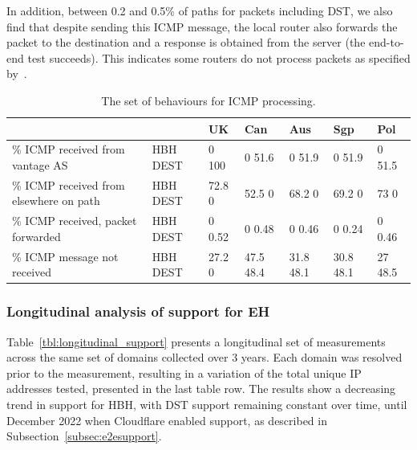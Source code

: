 \documentclass[conference]{IEEEtran}
\begin{document}
In addition, between 0.2 and 0.5\% of paths for packets including DST, we also find that despite sending this ICMP message, the local router also forwards the packet to the destination and a response is  obtained from the server (the end-to-end test succeeds). This indicates some routers do not process packets as specified by~\cite{RFC8200}.

\begin{table}
\begin{tabular}{p{}|p{}|p{}|p{}|p{}|p{}|p{}}

\centering

                                           &             & UK        & Can       & Aus    & Sgp          & Pol     \\
                                           \hline

{\% ICMP received from vantage AS}        & {HBH DEST} & {0 100}  & {0 51.6}    & {0 51.9}    & {0 51.9}    & {0 51.5}  \\
\hline
{\% ICMP received from elsewhere on path}          & {HBH DEST} & {72.8 0} & {52.5 0}    & {68.2 0}    & {69.2 0}    & {73  0}    \\
\hline

{\% ICMP received, packet forwarded}          & {HBH DEST} & {0 0.52} & {0 0.48}    & {0 0.46}    & {0 0.24}    & {0 0.46}  \\
\hline

{\% ICMP message not received} & {HBH DEST} & {27.2 0} & {47.5 48.4} & {31.8 48.1} & {30.8 48.1} & {27 48.5} 
\end{tabular}
\caption{The set of behaviours for ICMP processing.}
\label{tbl:icmp_support_dst}
\end{table}


\subsubsection{Longitudinal analysis of support for EH}

Table~\ref{tbl:longitudinal_support} presents a longitudinal set of measurements across the same set of domains collected over 3 years. Each domain was resolved prior to the measurement, resulting in a variation of the total unique IP addresses tested, presented in the last table row. The results show a decreasing trend in  support for HBH, with DST support remaining constant over time, until December 2022 when Cloudflare enabled support, as described in Subsection~\ref{subsec:e2esupport}.
\end{document}
